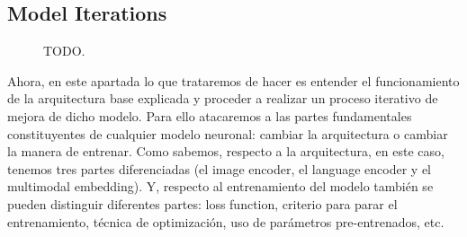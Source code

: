 \subsection{Model Iterations}\label{sec:model-iterations}

\begin{comment}
  1. He estado trabajando con el modelo de RefVOS, pero no he conseguido
  obtener ninguna mejora significativa. Hasta ahora lo que he probado ha sido:

  - Cambiar la manera en la que se unen las neuronas que provienen de la imagen
  y las que provienen del texto (en el modelo se usa multiplicación). He
  probado a entrenar con suma, resta, concatenación y proyectando usando una
  aplicación lineal (multiplicándolas por una matriz y luego combinándolas).

  - Probar diferentes funciones de error: "weighted cross entropy", "balanced
  cross entropy", "focal loss". Quiero probar también con otras como: "dice
  loss", "tversky index", "IoU loss"...  Las variaciones que he probado
  partiendo de parámetros pre-entrenados apenas varían el modelo (<1\mejora),
  posiblemente porque ya esté el modelo en cierto mínimo local de la función de
  error (al final son todas similares) y los gradientes son prácticamente
  nulos.

  Y probando variaciones con parámetros no-entrenados no consigo llegar a la
  precisión de RefVOS (entreno con train/validation/test y guardo los
  parámetros de la época con mejores resultados en validación).

  Por otro lado, he tratado de crear algún modelo desde 0, sin basarme en
  RefVOS, pero he obtenido resultados nefastos (cercanos a la aleatoriedad).
\end{comment}


\begin{figure}[p]
  \centering
  
  \caption[TODO]{TODO.}
\end{figure}


Ahora, en este apartada lo que trataremos de hacer es entender el
funcionamiento de la arquitectura base explicada y proceder a realizar un
proceso iterativo de mejora de dicho modelo. Para ello atacaremos a las partes
fundamentales constituyentes de cualquier modelo neuronal: cambiar la
arquitectura o cambiar la manera de entrenar. Como sabemos, respecto a la
arquitectura, en este caso, tenemos tres partes diferenciadas (el image
encoder, el language encoder y el multimodal embedding). Y, respecto al
entrenamiento del modelo también se pueden distinguir diferentes partes: loss
function, criterio para parar el entrenamiento, técnica de optimización, uso de
parámetros pre-entrenados, etc.

